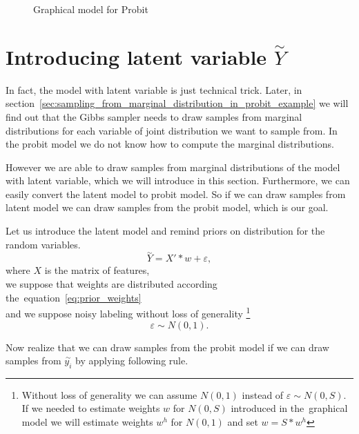 \begin{figure}[!hb]
\centering

\caption{Graphical model for Probit}
\label{fig:probitGM}
\end{figure}

\section{Introducing latent variable $\overset{\sim}{Y}$ }
\label{sec:introducing_latent_variale}
In fact, the model with latent variable is just technical trick. Later, in section~\ref{sec:sampling_from_marginal_distribution_in_probit_example} we will find out that the Gibbs sampler needs to draw samples from marginal distributions for each variable of joint distribution we want to sample from. In the probit model we do not know how to compute the marginal distributions.

However we are able to draw samples from marginal distributions of the model with latent variable, which we will introduce in this section. Furthermore, we can easily convert the latent model to probit model. So if we can draw samples from latent model we can draw samples from the probit model, which is our goal.

Let us introduce the latent model and remind priors on distribution for the random variables.
\begin{equation}\label{eq:lat}
    \overset{\sim}{Y} = X' * w + \varepsilon, 
\end{equation}
where $X$ is the matrix of features, \\
we suppose that weights are distributed according the~equation~\ref{eq:prior_weights} \\ 
and  we suppose noisy labeling without loss of generality 
\footnote{Without loss of generality we can assume $N(0,1)$ instead of $\varepsilon \sim N(0, S)$. 
    If we needed to estimate weights $w$ for $N(0, S)$ introduced in the~graphical model we will estimate weights $w^h$ for $N(0,1)$ and set $w = S*w^h$}
\begin{equation}\label{eq:noise}
\varepsilon \sim N(0, 1).
\end{equation}

Now realize that we can draw samples from the probit model if we can draw samples from $\overset{\sim}{y_{i}}$ by applying following rule.

